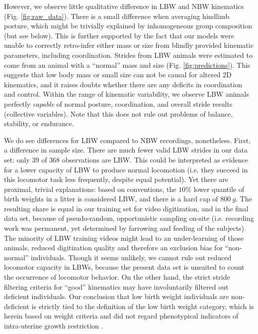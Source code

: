 However, we observe little qualitative difference in LBW and NBW kinematics (Fig. \ref{fig:raw_data}).
There is a small difference when averaging hindlimb posture, which might be trivially explained by inhomogeneous group composition (but see below).
This is further supported by the fact that our models were unable to correctly retro-infer either mass or size from blindly provided kinematic parameters, including coordination.
Strides from LBW animals were estimated to come from an animal with a ``normal'' mass and size (Fig. \ref{fig:predictions}).
This suggests that low body mass or small size can not be causal for altered 2D kinematics, and it raises doubts whether there are any deficits in coordination and control.
Within the range of kinematic variability, we observe LBW animals perfectly \emph{capable} of normal posture, coordination, and overall stride results (collective variables).
Note that this does not rule out problems of balance, stability, or endurance.


We do see differences for LBW compared to NBW recordings, nonetheless.
First, a difference in sample size.
There are much fewer valid LBW strides in our data set: only \(39\) of \(368\) observations are LBW.
This could be interpreted as evidence for a lower capacity  of LBW to produce normal locomotion (i.e. they succeed in this locomotor task less frequently, despite equal potential).
Yet there are proximal, trivial explanations: based on conventions, the \(10 \%\) lower quantile of birth weights in a litter is considered LBW, and there is a hard cap of \(800\ g\).
The resulting share is equal in our training set for video digitization, and in the final data set, because of pseudo-random, opportunistic sampling on-site (i.e. recording work was permanent, yet determined by farrowing and feeding of the subjects).
The minority of LBW training videos might lead to an under-learning of those animals, reduced digitization quality and therefore an exclusion bias for ``non-normal'' individuals.
Though it seems unlikely, we cannot rule out reduced locomotor capacity in LBWs, because the present data set is unsuited to count the occurrence of locomotor behavior.
On the other hand, the strict stride filtering criteria for ``good'' kinematics may have involuntarily filtered out deficient individuals.
Our conclusion that low birth weight individuals are non-deficient is strictly tied to the definition of the low birth weight category, which is herein based on weight criteria and did not regard phenotypical indicators of intra-uterine growth restriction \citep[which we did not record, \textit{cf.}][]{Amdi2013}.



